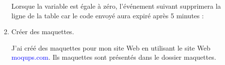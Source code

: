 \documentclass{article}
\begin{document}
\begin{enumerate}
\begin{enumerate}
		\hspace*{-1.05in}
               \noindent{}
               
                Lorsque la variable est égale à zéro, l'événement suivant supprimera la ligne de la table car le code envoyé aura expiré après 5 minutes :
         
		\hspace*{-1.05in}
               \noindent{}
         
        
         \item \textcolor{amethyst}{Créer des maquettes}.
         
         \vspace{0.4cm}
                \setlength{\parindent}{1cm} J'ai créé des maquettes pour mon site Web en utilisant le site Web \textcolor{blue}{moqups.com}. Ils maquettes sont présentés dans le dossier maquettes.
         

\end{enumerate}
\end{enumerate}
\end{document}
